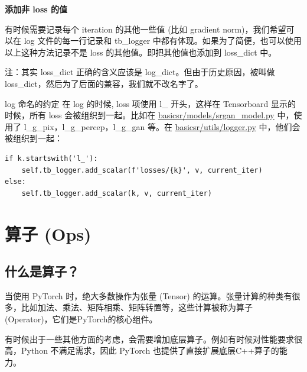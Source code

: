 \documentclass[../main.tex]{subfiles}
\begin{document}
\begin{note} %
    \textbf{添加非 loss 的值}

    有时候需要记录每个 iteration 的其他一些值 (比如 gradient norm)，我们希望可以在 log 文件的每一行记录和 tb\_logger 中都有体现。如果为了简便，也可以使用以上这种方法记录不是 loss 的其他值。即把其他值也添加到 loss\_dict 中。

    注：其实 loss\_dict 正确的含义应该是 log\_dict。但由于历史原因，被叫做 loss\_dict，然后为了后面的兼容，我们就不改名字了。
\end{note}

\begin{exampleBox}[righthand ratio=0.00, sidebyside, sidebyside align=center, lower separated=false]{log 命名的约定}
在 log 的时候, loss 项使用 l\_ 开头，这样在 Tensorboard 显示的时候，所有 loss 会被组织到一起。比如在 \href{https://github.com/XPixelGroup/BasicSR/blob/master/basicsr/models/srgan_model.py}{basicsr/models/srgan\_model.py} 中，使用了 l\_g\_pix，l\_g\_percep，l\_g\_gan 等。在 \href{https://github.com/XPixelGroup/BasicSR/blob/master/basicsr/utils/logger.py}{basicsr/utils/logger.py} 中，他们会被组织到一起：
\begin{verbatim}
if k.startswith('l_'):
    self.tb_logger.add_scalar(f'losses/{k}', v, current_iter)
else:
    self.tb_logger.add_scalar(k, v, current_iter)
\end{verbatim}
\end{exampleBox}

\section{算子 (Ops)}\label{code_structure:ops}

\subsection{什么是算子？}

当使用 PyTorch 时，绝大多数操作为张量 (Tensor) 的运算。张量计算的种类有很多，比如加法、乘法、矩阵相乘、矩阵转置等，这些计算被称为算子 (Operator)，它们是PyTorch的核心组件。

有时候出于一些其他方面的考虑，会需要增加底层算子。例如有时候对性能要求很高，Python 不满足需求，因此 PyTorch 也提供了直接扩展底层C++算子的能力。
\end{document}
